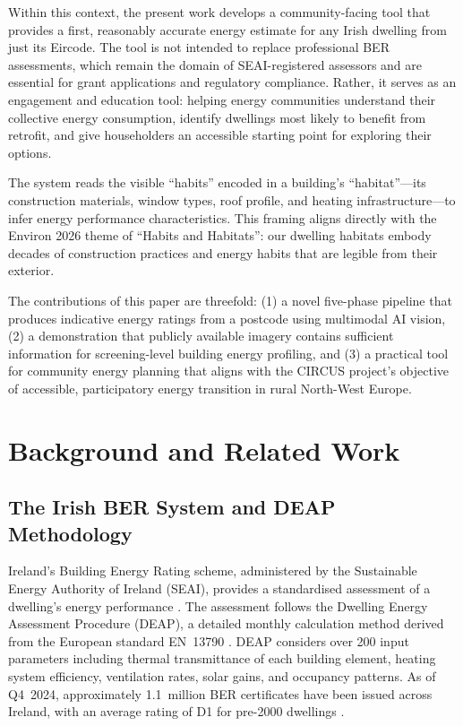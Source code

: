 \documentclass[preprint,12pt,authoryear]{elsarticle}
\begin{document}
Within this context, the present work develops a community-facing tool that provides a first, reasonably accurate energy estimate for any Irish dwelling from just its Eircode. The tool is not intended to replace professional BER assessments, which remain the domain of SEAI-registered assessors and are essential for grant applications and regulatory compliance. Rather, it serves as an engagement and education tool: helping energy communities understand their collective energy consumption, identify dwellings most likely to benefit from retrofit, and give householders an accessible starting point for exploring their options.

The system reads the visible ``habits'' encoded in a building's ``habitat''---its construction materials, window types, roof profile, and heating infrastructure---to infer energy performance characteristics. This framing aligns directly with the Environ 2026 theme of ``Habits and Habitats'': our dwelling habitats embody decades of construction practices and energy habits that are legible from their exterior.

The contributions of this paper are threefold: (1) a novel five-phase pipeline that produces indicative energy ratings from a postcode using multimodal AI vision, (2) a demonstration that publicly available imagery contains sufficient information for screening-level building energy profiling, and (3) a practical tool for community energy planning that aligns with the CIRCUS project's objective of accessible, participatory energy transition in rural North-West Europe.

\section{Background and Related Work}
\label{sec:background}

\subsection{The Irish BER System and DEAP Methodology}

Ireland's Building Energy Rating scheme, administered by the Sustainable Energy Authority of Ireland (SEAI), provides a standardised assessment of a dwelling's energy performance \citep{seai_ber_scheme}. The assessment follows the Dwelling Energy Assessment Procedure (DEAP), a detailed monthly calculation method derived from the European standard EN~13790 \citep{en_13790, seai_deap_manual}. DEAP considers over 200 input parameters including thermal transmittance of each building element, heating system efficiency, ventilation rates, solar gains, and occupancy patterns. As of Q4~2024, approximately 1.1~million BER certificates have been issued across Ireland, with an average rating of D1 for pre-2000 dwellings \citep{cso_ber_2024}.
\end{document}
